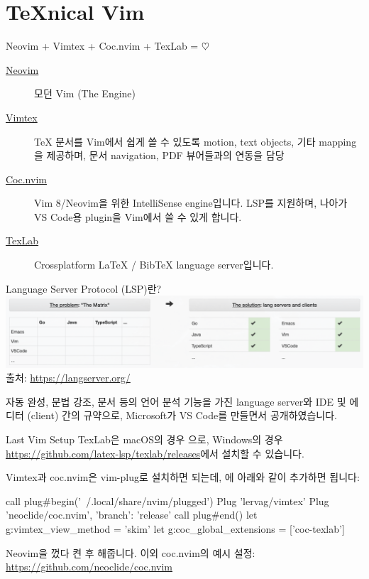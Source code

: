 \documentclass{beamer}
\begin{document}
\section{\TeX{}nical Vim}

\begin{frame}{Neovim + Vimtex + Coc.nvim + TexLab = $\heartsuit$}
  \begin{description}
    \item[\href{https://neovim.io/}{Neovim}] 모던 Vim (The Engine)
    \item[\href{https://github.com/lervag/vimtex}{Vimtex}] \TeX{} 문서를
      Vim에서 쉽게 쓸 수 있도록 motion, text objects, 기타 mapping을 제공하며,
      문서 navigation, PDF 뷰어들과의 연동을 담당
    \item[\href{https://github.com/neoclide/coc.nvim}{Coc.nvim}] Vim 8/Neovim을
      위한 IntelliSense engine입니다. LSP를 지원하며, 나아가 VS Code용 plugin을
      Vim에서 쓸 수 있게 합니다.
    \item[\href{https://texlab.netlify.com/}{TexLab}] Crossplatform \LaTeX{} /
      Bib\TeX{} language server입니다.
  \end{description}
\end{frame}

\begin{frame}{Language Server Protocol (LSP)란?}
  \centering\includegraphics[width=\linewidth]{figures/lsp-solution}
  {\tiny 출처: \url{https://langserver.org/}}

  자동 완성, 문법 강조, 문서 등의 언어 분석 기능을 가진 language server와 IDE
  및 에디터 (client) 간의 규약으로, Microsoft가 VS Code를 만들면서
  공개하였습니다.
\end{frame}

\begin{frame}[fragile]{Last Vim Setup}
  TexLab은 macOS의 경우 으로, Windows의 경우
  \url{https://github.com/latex-lsp/texlab/releases}에서 설치할 수 있습니다.

  Vimtex과 coc.nvim은 vim-plug로 설치하면 되는데, 에 아래와
  같이 추가하면 됩니다:
  \begin{vimcode}
    call plug#begin('~/.local/share/nvim/plugged')
    Plug 'lervag/vimtex'
    Plug 'neoclide/coc.nvim', { 'branch': 'release' }
    call plug#end()
    let g:vimtex_view_method = 'skim'
    let g:coc_global_extensions = ['coc-texlab']
  \end{vimcode}

  Neovim을 껐다 켠 후  해줍니다.
  이외 coc.nvim의 예시 설정: \url{https://github.com/neoclide/coc.nvim}
\end{frame}
\end{document}
